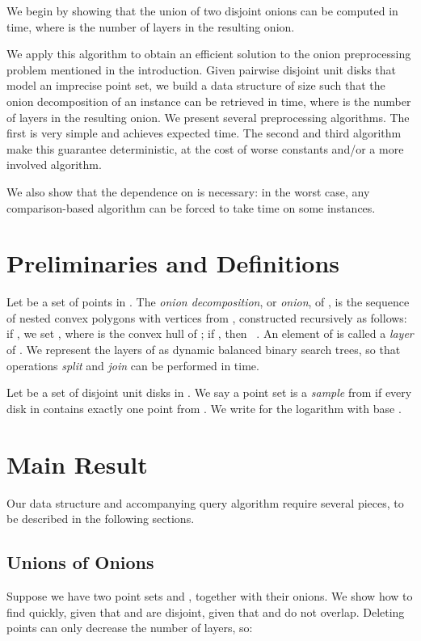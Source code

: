 \documentclass{paper}
\begin{document}
We begin by showing that the union of two disjoint onions can be computed in 
 time, where  is the number of layers in the
resulting onion.

We apply this algorithm to obtain an efficient solution to the
onion preprocessing problem mentioned in the introduction.
Given  pairwise disjoint unit disks that model
an imprecise point set, we build a data structure of size
 such that the onion decomposition of an instance can be 
retrieved in  time, where  is 
the number of layers in the resulting onion.
We present several preprocessing algorithms. 
The first is very simple and achieves 
expected time. The second and third algorithm make this guarantee 
deterministic, at the cost of worse constants and/or a more involved
algorithm.

We also show that the dependence on  is necessary:
in the worst case, any comparison-based algorithm
can be forced to take  time on some instances.

\section {Preliminaries and Definitions}

Let  be a set of  points in . 
The \emph {onion decomposition}, or \emph {onion}, of , is the 
sequence  of nested convex polygons with vertices 
from , 
constructed recursively as follows:
if ,  we set 
,
where  is the convex hull of ;
if , then 
~\cite {c-clps-85}.
An element of  is called a \emph{layer} of .
We represent the layers of  as dynamic balanced binary search
trees, so that operations \emph{split} and \emph{join} can be performed
in  time.

Let  be a set of disjoint unit disks in . We say a point set 
 is a \emph {sample} from  if every disk in  contains
exactly one point from . 
We write  for the logarithm with base .

\section {Main Result}

Our data structure and accompanying query algorithm require several pieces, to be described in the
following sections.

\subsection {Unions of Onions}

Suppose we have two point sets  and , together with their onions. 
We show how to find  quickly, given that 
and  are disjoint, given that  and  do not overlap.
Deleting points can only decrease
the number of layers, so:
\end{document}
